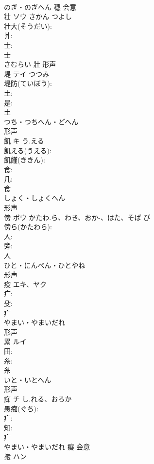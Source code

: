 \documentclass[8pt]{extreport}
\begin{document}
\begin{CJK}{UTF8}{min}
\\	のぎ・のぎへん	穗	会意 
\\	壮	ソウ	さかん	つよし	
\\	壮大(そうだい): 
\\	爿: 
\\	士: 
\\	士	
\\	さむらい	壯	形声 
\\	堤	テイ	つつみ		
\\	堤防(ていぼう): 
\\	土: 
\\	是: 
\\	土	
\\	つち・つちへん・どへん	
\\	形声 
\\	飢	キ	う.える		
\\	飢える(うえる): 
\\	飢饉(ききん): 
\\	食: 
\\	几: 
\\	食	
\\	しょく・しょくへん	
\\	形声 
\\	傍	ボウ	かたわ.ら、わき、おか-、はた、そば	び	
\\	傍ら(かたわら): 
\\	人: 
\\	旁: 
\\	人	
\\	ひと・にんべん・ひとやね	
\\	形声 
\\	疫	エキ、ヤク			
\\	疒: 
\\	殳: 
\\	疒	
\\	やまい・やまいだれ	
\\	形声 
\\	累	ルイ			
\\	田: 
\\	糸: 
\\	糸	
\\	いと・いとへん	
\\	形声 
\\	痴	チ	し.れる、おろか		
\\	愚痴(ぐち): 
\\	疒: 
\\	知: 
\\	疒	
\\	やまい・やまいだれ	癡	会意 
\\	搬	ハン			

\end{CJK}
\end{document}
